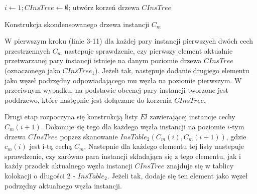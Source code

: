 \documentclass[12pt]{article}
\makeatletter
\newcounter{algorytm}
\newenvironment{algorytm}[1][htb]
  {
  \renewcommand*{\algorithmcfname}{Algorytm}%
  \let\c@algocf\c@algorytm
   \begin{algorithm}[#1]
  }
  {\end{algorithm}}
\makeatother
\begin{document}
\begin{algorytm}
$ i \leftarrow 1; CInsTree \leftarrow \emptyset$; utwórz korzeń drzewa $ CInsTree $\;
\caption{Konstrukcja skondensowanego drzewa instancji $ C_{m} $}
\label{alg:chinczyki_step41}
\end{algorytm}

W pierwszym kroku (linie 3-11) dla każdej pary instancji pierwszych dwóch cech przestrzennych $ C_{m} $ nastepuje sprawdzenie, czy pierwszy element aktualnie przetwarzanej pary instancji istnieje na danym poziomie drzewa $ CInsTree $ (oznaczonego jako $CInsTree_{1}$). Jeżeli tak, następuje dodanie drugiego elementu jako węzeł podrzędny odpowiadającego mu węzła na poziomie pierwszym. W przeciwnym wypadku, na podstawie obecnej pary instancji tworzone jest poddrzewo, które następnie jest dołączane do korzenia $ CInsTree $. 

Drugi etap rozpoczyna się konstrukcją listy $ El$ zawierającej instancje cechy $ C_{m}(i+1) $. Dokonuje się tego dla każdego węzła instancji na poziomie $i$-tym drzewa $CInsTree$ popzez skanowanie $ InsTable_{2}(C_{m}(i),C_{m}(i+1))$, gdzie $ c_{m}(i)$ jest i-tą cechą $ C_{m} $. Nastepnie dla każdego elementu tej listy nastepuje sprawdzenie, czy zarówno para instancji składająca się z tego elementu, jak i każdy przodek aktualnego węzła instancji $ CInsTree$ znajduje się w tablicy kolokacji o długości 2 - $InsTable_{2}$. Jeżeli tak, dodaje się ten element jako węzeł podrzędny aktualnego węzła instancji.
\end{document}
